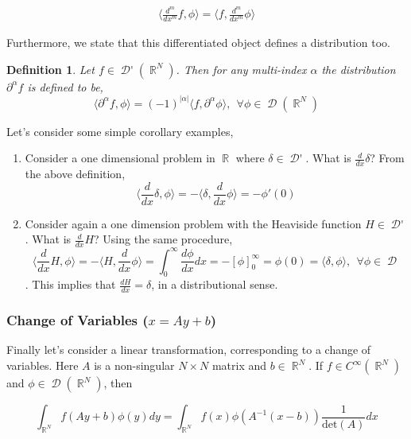 \documentclass[12pt, a4]{article}
\newtheorem{definition}{Definition}[section]
\DeclareMathOperator\reals{\mathbb{R}}
\DeclareMathOperator\tfspaceD{\mathcal{D}}
\DeclareMathOperator\dist{\mathcal{D'}}
\begin{document}
\begin{eqnarray}
    \langle \frac{d^m}{dx^m}f, \phi \rangle = \langle f, \frac{d^m}{dx^m} \phi \rangle
\end{eqnarray}

Furthermore, we state that this differentiated object defines a distribution too.

\begin{definition}
    Let $f \in \dist(\reals^N)$. Then for any multi-index $\alpha$ the distribution $\partial^\alpha f$ is defined to be, \[ \langle \partial^\alpha f, \phi \rangle = (-1)^{|\alpha|} \langle f, \partial^\alpha \phi \rangle, \> \> \forall \phi \in \tfspaceD(\reals^N) \]
    \label{def:differentiate_distribution}
\end{definition}

Let's consider some simple corollary examples,

\begin{enumerate}
    \item Consider a one dimensional problem in $\reals$ where $\delta \in \dist$. What is $\frac{d}{dx}\delta$? From the above definition, \[
        \langle \frac{d}{dx} \delta, \phi\rangle = - \langle \delta, \frac{d}{dx}\phi \rangle = -\phi'(0)\]
    \item Consider again a one dimension problem with the Heaviside function $H \in \dist$. What is $\frac{d}{dx}H$? Using the same procedure, \[
        \langle \frac{d}{dx}H, \phi \rangle = -\langle H, \frac{d}{dx} \phi \rangle = \int_0^\infty \frac{d\phi}{dx}dx = -[\phi]_0^\infty = \phi(0) = \langle \delta, \phi \rangle, \> \> \forall \phi \in \tfspaceD \]. This implies that $\frac{dH}{dx} = \delta$, in a distributional sense.
\end{enumerate}

\subsubsection{Change of Variables ($x = Ay + b$)}

Finally let's consider a linear transformation, corresponding to a change of variables. Here $A$ is a non-singular $N \times N$ matrix and $b \in \reals^N$. If $f \in C^\infty(\reals^N)$ and $\phi \in \tfspaceD(\reals^N)$, then

\begin{equation}
    \int_{\reals^N}f(Ay+b)\phi(y)dy = \int_{\reals^N}f(x)\phi(A^{-1}(x-b))\frac{1}{\text{det}(A)}dx
\end{equation}
\end{document}
